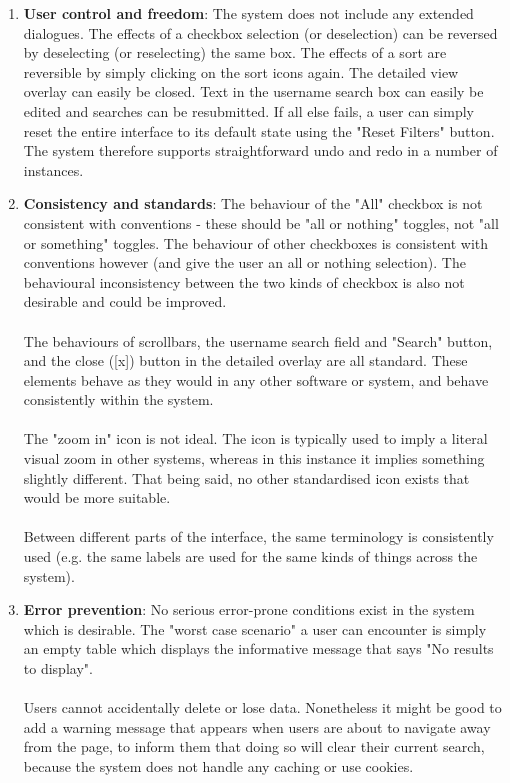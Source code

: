 \begin{enumerate}
\item \textbf{User control and freedom}: The system does not include any extended dialogues. The effects of a checkbox selection (or deselection) can be reversed by deselecting (or reselecting) the same box. The effects of a sort are reversible by simply clicking on the sort icons again. The detailed view overlay can easily be closed. Text in the username search box can easily be edited and searches can be resubmitted. If all else fails, a user can simply reset the entire interface to its default state using the "Reset Filters" button. The system therefore supports straightforward undo and redo in a number of instances.

\item \textbf{Consistency and standards}: The behaviour of the "All" checkbox is not consistent with conventions - these should be "all or nothing" toggles, not "all or something" toggles. The behaviour of other checkboxes is consistent with conventions however (and give the user an all or nothing selection). The behavioural inconsistency between the two kinds of checkbox is also not desirable and could be improved. \\
\\
The behaviours of scrollbars, the username search field and "Search" button, and the close ([x]) button in the detailed overlay are all standard. These elements behave as they would in any other software or system, and behave consistently within the system. \\
\\
The "zoom in" icon is not ideal. The icon is typically used to imply a literal visual zoom in other systems, whereas in this instance it implies something slightly different. That being said, no other standardised icon exists that would be more suitable. \\
\\
Between different parts of the interface, the same terminology is consistently used (e.g. the same labels are used for the same kinds of things across the system). 

\item \textbf{Error prevention}: No serious error-prone conditions exist in the system which is desirable. The "worst case scenario" a user can encounter is simply an empty table which displays the informative message that says "No results to display". \\
\\
Users cannot accidentally delete or lose data. Nonetheless it might be good to add a warning message that appears when users are about to navigate away from the page, to inform them that doing so will clear their current search, because the system does not handle any caching or use cookies. \\


\end{enumerate}

